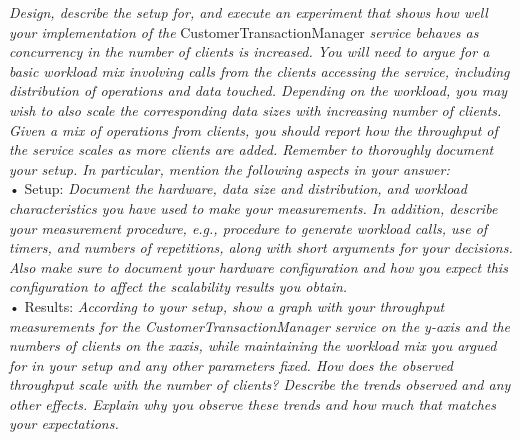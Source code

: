 \documentclass[paper=a4, fontsize=11pt]{scrartcl} %
\numberwithin{equation}{section} %
\numberwithin{figure}{section} %
\numberwithin{table}{section} %
\begin{document}
\textit{Design, describe the setup for, and execute an experiment that shows how well your
implementation of the }CustomerTransactionManager\textit{ service behaves as concurrency in the
number of clients is increased. You will need to argue for a basic workload mix involving calls from the
clients accessing the service, including distribution of operations and data touched. Depending on the
workload, you may wish to also scale the corresponding data sizes with increasing number of clients.
Given a mix of operations from clients, you should report how the throughput of the service scales as
more clients are added. Remember to thoroughly document your setup. In particular, mention the
following aspects in your answer:}\\
• Setup: \textit{Document the hardware, data size and distribution, and workload characteristics you
have used to make your measurements. In addition, describe your measurement procedure, e.g.,
procedure to generate workload calls, use of timers, and numbers of repetitions, along with short
arguments for your decisions. Also make sure to document your hardware configuration and how
you expect this configuration to affect the scalability results you obtain.}\\
• Results:\textit{ According to your setup, show a graph with your throughput measurements for the
CustomerTransactionManager service on the y-axis and the numbers of clients on the xaxis,
while maintaining the workload mix you argued for in your setup and any other parameters
fixed. How does the observed throughput scale with the number of clients? Describe the trends
observed and any other effects. Explain why you observe these trends and how much that matches
your expectations.
}\\
\end{document}
